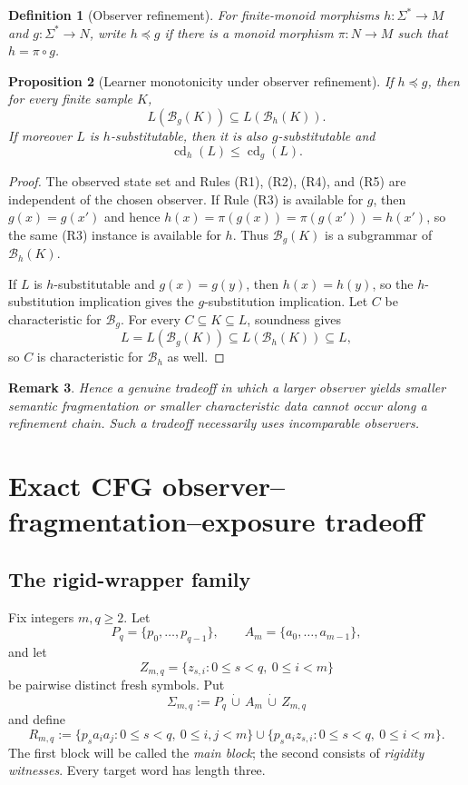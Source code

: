 \documentclass[11pt]{article}
\newtheorem{definition}{Definition}[section]
\newtheorem{proposition}[definition]{Proposition}
\newtheorem{remark}[definition]{Remark}
\newcommand{\cd}{\operatorname{cd}}
\newcommand{\B}{\mathcal B}
\begin{document}
\begin{definition}[Observer refinement]
For finite-monoid morphisms $h:\Sigma^*\to M$ and $g:\Sigma^*\to N$, write
$h\preceq g$ if there is a monoid morphism $\pi:N\to M$ such that
$h=\pi\circ g$.
\end{definition}

\begin{proposition}[Learner monotonicity under observer refinement]
\label{prop:learner-monotone}
If $h\preceq g$, then for every finite sample $K$,
\[
 L(\B_g(K))\subseteq L(\B_h(K)).
\]
If moreover $L$ is $h$-substitutable, then it is also $g$-substitutable and
\[
 \cd_h(L)\le \cd_g(L).
\]
\end{proposition}

\begin{proof}
The observed state set and Rules (R1), (R2), (R4), and (R5) are independent
of the chosen observer.  If Rule (R3) is available for $g$, then
$g(x)=g(x')$ and hence $h(x)=\pi(g(x))=\pi(g(x'))=h(x')$, so the same (R3)
instance is available for $h$.  Thus $\B_g(K)$ is a subgrammar of
$\B_h(K)$.

If $L$ is $h$-substitutable and $g(x)=g(y)$, then $h(x)=h(y)$, so the
$h$-substitution implication gives the $g$-substitution implication.  Let
$C$ be characteristic for $\B_g$.  For every $C\subseteq K\subseteq L$,
soundness gives
\[
 L=L(\B_g(K))\subseteq L(\B_h(K))\subseteq L,
\]
so $C$ is characteristic for $\B_h$ as well.
\end{proof}

\begin{remark}
Hence a genuine tradeoff in which a larger observer yields smaller semantic
fragmentation or smaller characteristic data cannot occur along a refinement
chain.  Such a tradeoff necessarily uses incomparable observers.
\end{remark}


\section{Exact CFG observer--fragmentation--exposure tradeoff}
\label{sec:cfg-tradeoff}

\subsection{The rigid-wrapper family}

Fix integers $m,q\ge2$.  Let
\[
 P_q=\{p_0,\ldots,p_{q-1}\},\qquad
 A_m=\{a_0,\ldots,a_{m-1}\},
\]
and let
\[
 Z_{m,q}=\{z_{s,i}:0\le s<q,\ 0\le i<m\}
\]
be pairwise distinct fresh symbols.  Put
\[
 \Sigma_{m,q}:=P_q\,\dot\cup\,A_m\,\dot\cup\,Z_{m,q}
\]
and define
\begin{equation}
\label{eq:Rmq}
 R_{m,q}
 :=
 \{p_sa_i a_j:0\le s<q,\ 0\le i,j<m\}
 \cup
 \{p_sa_i z_{s,i}:0\le s<q,\ 0\le i<m\}.
\end{equation}
The first block will be called the \emph{main block}; the second consists of
\emph{rigidity witnesses}.  Every target word has length three.
\end{document}
